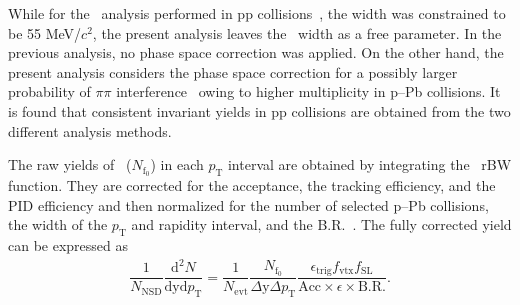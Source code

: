 While for the \fzero~analysis performed in pp collisions~\cite{ALICE:2022qnb}, the width was constrained to be 55 MeV/$c^{2}$, the present analysis leaves the \fzero~width as a free parameter. In the previous analysis, no phase space correction was applied. On the other hand, the present analysis considers the phase space correction for a possibly larger probability of $\pi\pi$ interference~\cite{STAR:2003vqj} owing to higher multiplicity in p--Pb collisions. It is found that consistent invariant yields in pp collisions are obtained from the two different analysis methods.

The raw yields of \fzero~($N_{\mathrm{f}_{0}}$) in each $p_{\mathrm{T}}$ interval are obtained by integrating the \fzero~rBW function. They are corrected for the acceptance, the tracking efficiency, and the PID efficiency and then normalized for the number of selected p--Pb collisions, the width of the $p_{\mathrm{T}}$ and rapidity interval, and the B.R.~\cite{Stone:2013eaa}. The fully corrected yield can be expressed as
\begin{eqnarray}
\dfrac{1}{N_{\mathrm{NSD}}}\dfrac{\mathrm{d}^{2}N}{\mathrm{dyd}p_{\mathrm{T}}} = \dfrac{1}{N_{\mathrm{evt}}} \dfrac{ N_{\mathrm{f}_{0}} }{ \Delta \mathrm{y} \Delta p_{\mathrm{T}} } \dfrac{  \epsilon_{\mathrm{trig}} f_{\mathrm{vtx}} f_{\mathrm{SL}} }{\mathrm{Acc} \times \epsilon \times \mathrm{B.R.} }.
\end{eqnarray}
